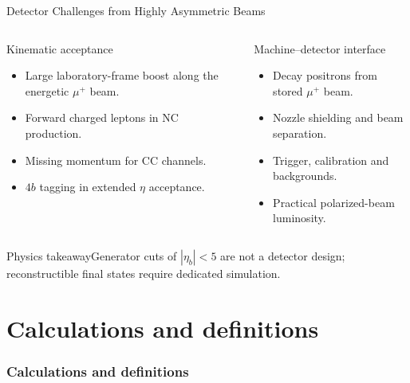 \documentclass[aspectratio=1610,english]{beamer}
\newcommand{\src}[1]{\vfill{\par\color{black!65}\fontsize{6.4}{7.4}\selectfont\emph{Source:} #1\par}}
\newcommand{\key}[1]{\begin{alertblock}{Physics takeaway}\scriptsize #1\end{alertblock}}
\begin{document}
\begin{frame}[t]{Detector Challenges from Highly Asymmetric Beams}
\small

\begin{columns}%
\begin{block}{Kinematic acceptance}
\begin{itemize}
\justifying
\item Large laboratory-frame boost along the energetic $\mu^+$ beam.
\item Forward charged leptons in NC production.
\item Missing momentum for CC channels.
\item $4b$ tagging in extended $\eta$ acceptance.
\end{itemize}\end{block}
\begin{block}{Machine--detector interface}
\begin{itemize}
\justifying
\item Decay positrons from stored $\mu^+$ beam.
\item Nozzle shielding and beam separation.
\item Trigger, calibration and backgrounds.
\item Practical polarized-beam luminosity.
\end{itemize}\end{block}
\end{columns}
\key{Generator cuts of $|\eta_b|<5$ are not a detector design; reconstructible final states require dedicated simulation.}

\end{frame}




\part{Calculations and definitions}
\section{Calculations and definitions}
\end{document}
